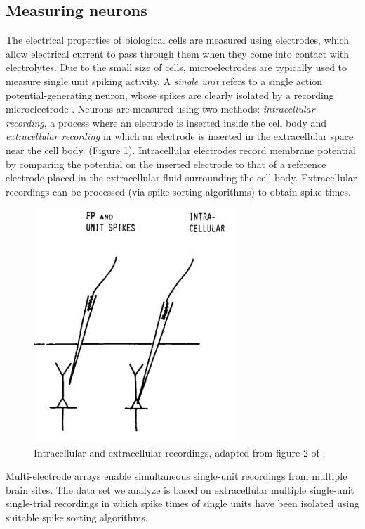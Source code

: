 \subsection{Measuring neurons}
The electrical properties of biological cells are measured using electrodes, which allow electrical current to pass through them when they come into contact with electrolytes. Due to the small size of cells, microelectrodes are typically used to measure single unit spiking activity.
A \textit{single unit} refers to a single action potential-generating neuron, whose spikes are clearly isolated by a recording microelectrode \cite{Humphrey1990}.
Neurons are measured using two methods: \textit{intracellular recording}, a process where an electrode is inserted inside the cell body and \textit{extracellular recording} in which an electrode is inserted in the extracellular space near the cell body. (Figure \ref{fig:Electrodes}).
Intracellular electrodes record membrane potential by comparing the potential on the inserted electrode to that of a reference electrode placed in the extracellular fluid surrounding the cell body. Extracellular recordings can be 
processed (via spike sorting algorithms) to obtain spike times.

\begin{figure}[h]
\centering
\includegraphics[width=3in]{./images/MeasuringNeuron.png}
\caption{Intracellular and  extracellular recordings, adapted from figure 2 of \cite{Humphrey1990}.}
      \label{fig:Electrodes}
\end{figure}

Multi-electrode arrays enable simultaneous single-unit recordings from multiple brain sites. The data set we analyze is based on extracellular multiple single-unit single-trial recordings in which spike times of single units have been isolated using suitable spike sorting algorithms.


